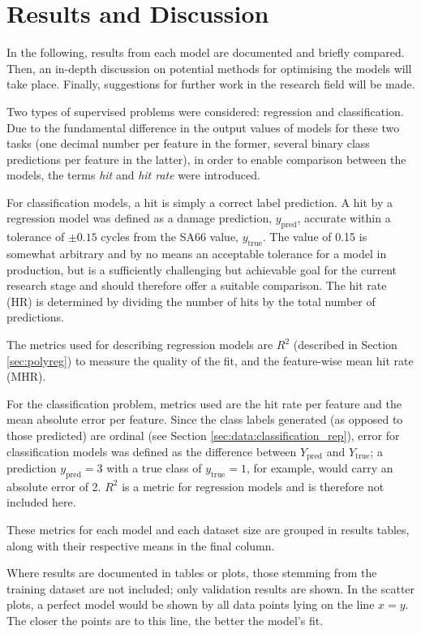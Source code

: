 \chapter{Results and Discussion} \label{sec:discussion}
In the following, results from each model are documented and briefly compared. Then, an in-depth discussion on potential methods for optimising the models will take place. Finally, suggestions for further work in the research field will be made.

Two types of supervised problems were considered: regression and classification. Due to the fundamental difference in the output values of models for these two tasks (one decimal number per feature in the former, several binary class predictions per feature in the latter), in order to enable comparison between the models, the terms \textit{hit} and \textit{hit rate} were introduced.

For classification models, a hit is simply a correct label prediction. A hit by a regression model was defined as a damage prediction, \(y_\text{pred}\), accurate within a tolerance of \(\pm0.15\) cycles from the SA66 value, \(y_\text{true}\). The value of 0.15 is somewhat arbitrary and by no means an acceptable tolerance for a model in production, but is a sufficiently challenging but achievable goal for the current research stage and should therefore offer a suitable comparison. The hit rate (HR) is determined by dividing the number of hits by the total number of predictions.

The metrics used for describing regression models are \(R^2\) (described in Section \ref{sec:polyreg}) to measure the quality of the fit, and the feature-wise mean hit rate (MHR).

For the classification problem, metrics used are the hit rate per feature and the mean absolute error per feature. Since the class labels generated (as opposed to those predicted) are ordinal (see Section \ref{sec:data:classification_rep}), error for classification models was defined as the difference between \(Y_\text{pred}\) and \(Y_\text{true}\); a prediction \(y_\text{pred} = 3\) with a true class of \(y_\text{true} = 1\), for example, would carry an absolute error of 2. \(R^2\) is a metric for regression models and is therefore not included here.

These metrics for each model and each dataset size are grouped in results tables, along with their respective means in the final column.

Where results are documented in tables or plots, those stemming from the training dataset are not included; only validation results are shown. In the scatter plots, a perfect model would be shown by all data points lying on the line \(x = y\). The closer the points are to this line, the better the model's fit.

